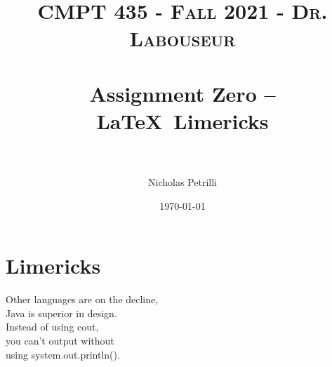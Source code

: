 \documentclass{article}
\title{	
   \normalfont \normalsize 
   \textsc{CMPT 435 - Fall 2021 - Dr. Labouseur} \\[10pt] %
   \horrule{0.5pt} \\[0.25cm] 	%
   \huge Assignment Zero -- \LaTeX ~Limericks \\     	    %
   \horrule{0.5pt} \\[0.25cm] 	%
}
\author{Nicholas Petrilli }
\date{\normalsize\today}
\begin{document}
\maketitle

\section{Limericks}
\noindent
Other languages are on the decline, \\
Java is superior in design. \\
   \hspace*{1.5em}Instead of using cout, \\
   \hspace*{1.5em}you can't output without      \\
using system.out.println(). \\
\end{document}
